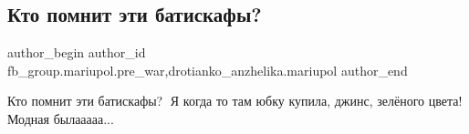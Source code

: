  
 
 
 
 

\subsection{Кто помнит эти батискафы?}
\label{sec:13_02_2023.fb.fb_group.mariupol.pre_war.8.kto_pomnit_eti_batis}
 
\ifcmt
 author_begin
   author_id fb_group.mariupol.pre_war,drotianko_anzhelika.mariupol
 author_end
\fi

Кто помнит эти батискафы?🤗 Я когда то там юбку купила, джинс, зелёного цвета! Модная былааааа...

